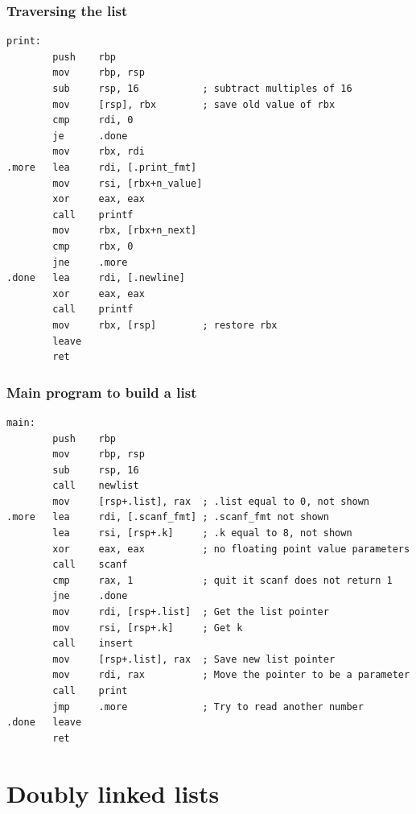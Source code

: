 \documentclass{beamer}
\begin{document}
\begin{frame}[fragile]
    \frametitle{Traversing the list}
\footnotesize
\begin{verbatim}
print:
        push    rbp
        mov     rbp, rsp
        sub     rsp, 16           ; subtract multiples of 16
        mov     [rsp], rbx        ; save old value of rbx
        cmp     rdi, 0
        je      .done
        mov     rbx, rdi
.more   lea     rdi, [.print_fmt]
        mov     rsi, [rbx+n_value]
        xor     eax, eax
        call    printf
        mov     rbx, [rbx+n_next]
        cmp     rbx, 0
        jne     .more
.done   lea     rdi, [.newline]
        xor     eax, eax
        call    printf
        mov     rbx, [rsp]        ; restore rbx
        leave
        ret
\end{verbatim}
\end{frame}

\begin{frame}[fragile]
    \frametitle{Main program to build a list}
\footnotesize
\begin{verbatim}
main:
        push    rbp
        mov     rbp, rsp
        sub     rsp, 16
        call    newlist
        mov     [rsp+.list], rax  ; .list equal to 0, not shown
.more   lea     rdi, [.scanf_fmt] ; .scanf_fmt not shown
        lea     rsi, [rsp+.k]     ; .k equal to 8, not shown
        xor     eax, eax          ; no floating point value parameters
        call    scanf
        cmp     rax, 1            ; quit it scanf does not return 1
        jne     .done
        mov     rdi, [rsp+.list]  ; Get the list pointer
        mov     rsi, [rsp+.k]     ; Get k
        call    insert
        mov     [rsp+.list], rax  ; Save new list pointer
        mov     rdi, rax          ; Move the pointer to be a parameter
        call    print
        jmp     .more             ; Try to read another number
.done   leave
        ret
\end{verbatim}
\end{frame}

\section{Doubly linked lists}
\end{document}
